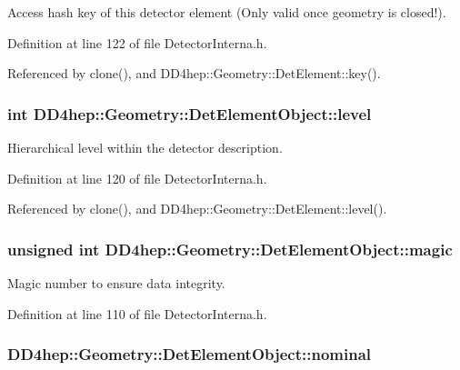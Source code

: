 Access hash key of this detector element (Only valid once geometry is closed!). 

Definition at line 122 of file DetectorInterna.h.

Referenced by clone(), and DD4hep::Geometry::DetElement::key().\hypertarget{class_d_d4hep_1_1_geometry_1_1_det_element_object_a734b4a41fa1d35d9a02b3b15d2739537}{
\subsubsection[{level}]{\setlength{\rightskip}{0pt plus 5cm}int {\bf DD4hep::Geometry::DetElementObject::level}}}
\label{class_d_d4hep_1_1_geometry_1_1_det_element_object_a734b4a41fa1d35d9a02b3b15d2739537}


Hierarchical level within the detector description. 

Definition at line 120 of file DetectorInterna.h.

Referenced by clone(), and DD4hep::Geometry::DetElement::level().\hypertarget{class_d_d4hep_1_1_geometry_1_1_det_element_object_a9a65b2f4323f3df2d7bdb7858b216fb6}{
\subsubsection[{magic}]{\setlength{\rightskip}{0pt plus 5cm}unsigned int {\bf DD4hep::Geometry::DetElementObject::magic}}}
\label{class_d_d4hep_1_1_geometry_1_1_det_element_object_a9a65b2f4323f3df2d7bdb7858b216fb6}


Magic number to ensure data integrity. 

Definition at line 110 of file DetectorInterna.h.\hypertarget{class_d_d4hep_1_1_geometry_1_1_det_element_object_a3020acb0795114c57c8d5bb536f310f4}{
\subsubsection[{nominal}]{ {\bf DD4hep::Geometry::DetElementObject::nominal}}}
\label{class_d_d4hep_1_1_geometry_1_1_det_element_object_a3020acb0795114c57c8d5bb536f310f4}



